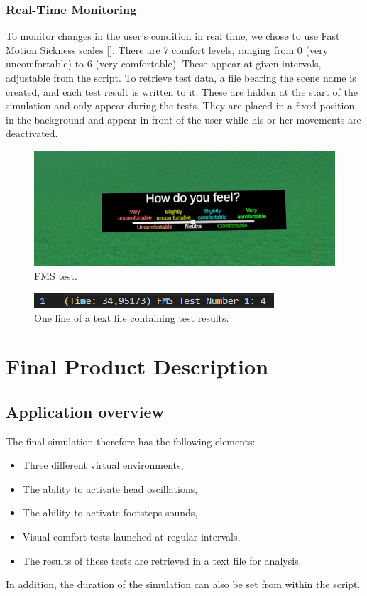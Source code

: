 \documentclass[american]{acmtog} %
\begin{document}
\subsubsection{Real-Time Monitoring}
To monitor changes in the user's condition in real time, we chose to use Fast Motion Sickness scales [\cite{course}]. There are 7 comfort levels, ranging from 0 (very uncomfortable) to 6 (very comfortable). These appear at given intervals, adjustable from the script. To retrieve test data, a file bearing the scene name is created, and each test result is written to it. These are hidden at the start of the simulation and only appear during the tests. They are placed in a fixed position in the background and appear in front of the user while his or her movements are deactivated.

\begin{figure}[H]
\centerline{\includegraphics[width=\columnwidth]{figures/test.png}}
\caption{FMS test.}
    \label{fig:test}
\end{figure}

\begin{figure}[H]
\centerline{\includegraphics[width=\columnwidth]{figures/tests_result.png}}
\caption{One line of a text file containing test results.}
    \label{fig:tests_result}
\end{figure}

\section{Final Product Description}
\label{sec:product}
\subsection{Application overview}
The final simulation therefore has the following elements:
\begin{itemize}[label=\textbullet]
    \item Three different virtual environments,
    \item The ability to activate head oscillations,
    \item The ability to activate footsteps sounds,
    \item Visual comfort tests launched at regular intervals,
    \item The results of these tests are retrieved in a text file for analysis.
\end{itemize}
In addition, the duration of the simulation can also be set from within the script.
\end{document}
